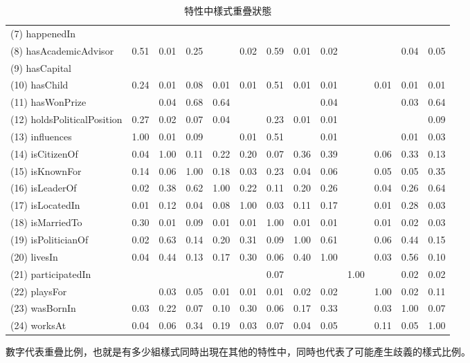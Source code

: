 \begin{table}[t]
\begin{center}
\begin{tabular}{l||*{12}{c}}
            (7) happenedIn  &    &    &    &    &    &    &    &    &    &    &    &   \\
            (8) hasAcademicAdvisor  & 0.51  & 0.01  & 0.25  &    & 0.02  & 0.59  & 0.01  & 0.02  &    &    & 0.04  & 0.05 \\
            (9) hasCapital  &    &    &    &    &    &    &    &    &    &    &    &   \\
            (10) hasChild  & 0.24  & 0.01  & 0.08  & 0.01  & 0.01  & 0.51  & 0.01  & 0.01  &    & 0.01  & 0.01  & 0.01 \\
            (11) hasWonPrize  &    & 0.04  & 0.68  & 0.64  &    &    &    & 0.04  &    &    & 0.03  & 0.64 \\
            (12) holdsPoliticalPosition  & 0.27  & 0.02  & 0.07  & 0.04  &    & 0.23  & 0.01  & 0.01  &    &    &    & 0.09 \\
            (13) influences  & 1.00  & 0.01  & 0.09  &    & 0.01  & 0.51  &    & 0.01  &    &    & 0.01  & 0.03 \\
            (14) isCitizenOf  & 0.04  & 1.00  & 0.11  & 0.22  & 0.20  & 0.07  & 0.36  & 0.39  &    & 0.06  & 0.33  & 0.13 \\
            (15) isKnownFor  & 0.14  & 0.06  & 1.00  & 0.18  & 0.03  & 0.23  & 0.04  & 0.06  &    & 0.05  & 0.05  & 0.35 \\
            (16) isLeaderOf  & 0.02  & 0.38  & 0.62  & 1.00  & 0.22  & 0.11  & 0.20  & 0.26  &    & 0.04  & 0.26  & 0.64 \\
            (17) isLocatedIn  & 0.01  & 0.12  & 0.04  & 0.08  & 1.00  & 0.03  & 0.11  & 0.17  &    & 0.01  & 0.28  & 0.03 \\
            (18) isMarriedTo  & 0.30  & 0.01  & 0.09  & 0.01  & 0.01  & 1.00  & 0.01  & 0.01  &    & 0.01  & 0.02  & 0.03 \\
            (19) isPoliticianOf  & 0.02  & 0.63  & 0.14  & 0.20  & 0.31  & 0.09  & 1.00  & 0.61  &    & 0.06  & 0.44  & 0.15 \\
            (20) livesIn  & 0.04  & 0.44  & 0.13  & 0.17  & 0.30  & 0.06  & 0.40  & 1.00  &    & 0.03  & 0.56  & 0.10 \\
            (21) participatedIn  &    &    &    &    &    & 0.07  &    &    & 1.00  &    & 0.02  & 0.02 \\
            (22) playsFor  &    & 0.03  & 0.05  & 0.01  & 0.01  & 0.01  & 0.02  & 0.02  &    & 1.00  & 0.02  & 0.11 \\
            (23) wasBornIn  & 0.03  & 0.22  & 0.07  & 0.10  & 0.30  & 0.06  & 0.17  & 0.33  &    & 0.03  & 1.00  & 0.07 \\
            (24) worksAt  & 0.04  & 0.06  & 0.34  & 0.19  & 0.03  & 0.07  & 0.04  & 0.05  &    & 0.11  & 0.05  & 1.00 \\
        \end{tabular}
        \caption{特性中樣式重疊狀態}
        \normalsize
        數字代表重疊比例，也就是有多少組樣式同時出現在其他的特性中，同時也代表了可能產生歧義的樣式比例。
        \label{t:yago-overlap}
    \end{center}
\end{table}
